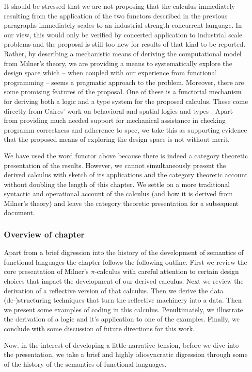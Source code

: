 It should be stressed that we are not proposing that the calculus
immediately resulting from the application of the two functors
described in the previous paragraphs immediately scales to an
industrial strength concurrent language. In our view, this would only
be verified by concerted application to industrial scale problems and
the proposal is still too new for results of that kind to be
reported. Rather, by describing a mechanistic means of deriving the
computational model from Milner's theory, we are providing a means to
systematically explore the design space which -- when coupled with our
experience from functional programming -- seems a pragmatic approach
to the problem. Moreover, there are some promising features of the
proposal. One of these is a functorial mechanism for deriving both a
logic and a type system for the proposed calculus. These come directly
from Caires' work on behavioral and spatial logics and types
\cite{}. Apart from providing much needed support for mechanical
assistance in checking programm correctness and adherence to spec, we
take this as supporting evidence that the proposed means of exploring
the design space is not without merit.

We have used the word functor above because there is indeed a category
theoretic presentation of the results. However, we cannot
simultaneously present the derived calculus with sketch of its
applications and the category theoretic account without doubling the
length of this chapter. We settle on a more traditional syntactic and
operational account of the calculus (and how it is derived from
Milner's theory) and leave the category theoretic presentation for a
subsequent document. 

\subsubsection{Overview of chapter}

Apart from a brief digression into the history of the development of
semantics of functional languages the chapter follows the following
outline. First we review the core presentation of Milner's
$\pi$-calculus with careful attention to certain design choices that
impact the development of our derived calculus. Next we review the
derivation of a reflective version of that calculus. Then we derive
the data (de-)structuring techniques that turn the reflective
machinery into a data. Then we present some examples of coding in this
calculus. Penultimately, we illustrate the derivation of a logic and
it's application to one of the examples. Finally, we conclude with
some discussion of future directions for this work.

Now, in the interest of developing a little narrative tension, before
we dive into the presentation, we take a brief and highly
idiosyncratic digression through some of the history of the semantics
of functional languages.